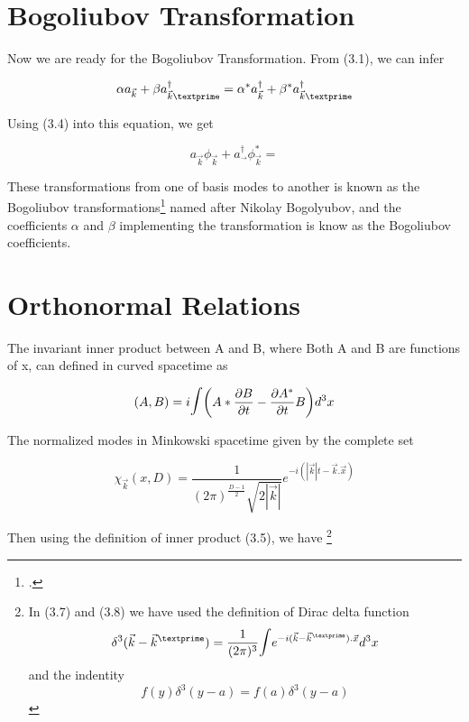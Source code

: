 \section{Bogoliubov Transformation}

Now we are ready for the Bogoliubov Transformation. From (3.1), we can infer

\begin{equation*}
\alpha a_{\vec{k}}+\beta a^\dagger_{\vec{k}\textprime} = \alpha^* a^\dagger_{\vec{k}}+\beta^* a^\dagger_{\vec{k}\textprime}  \end{equation*}

Using (3.4) into this equation, we get

\begin{equation*}
a_{\vec{k}}\phi_{\vec{k}}+ a^\dagger_{\vec{}}\phi^*_{\vec{k}}=
\end{equation*}

These transformations from one of basis modes to another is known as the Bogoliubov transformations\footcite[For a review please see ][]{Jacobson:2003} named after Nikolay Bogolyubov, and the coefficients $\alpha$ and $\beta$ implementing the transformation is know as the Bogoliubov coefficients.

\section{Orthonormal Relations}

The invariant inner product between A and B, where Both A and B are functions of x, can defined in curved spacetime as 

\begin{equation}
(A,B) = i \mathlarger{\mathlarger{\int}} \bigg(A*\frac{\partial B}{\partial t} - \frac{\partial A^*}{\partial t}B \bigg) d^3x
\end{equation}

The normalized modes in Minkowski spacetime given by the complete set

\begin{equation}
\chi_{\vec{k}} (x,D) = \frac{1}{(2\pi)^{\frac{D-1}{2}} \sqrt{2|\vec{k}|}}e^{-i(|\vec{k}|t - \vec{k}.\vec{x})}
\end{equation}

Then using the definition of inner product (3.5), we have \footnote{In (3.7) and (3.8) we have used the definition of Dirac delta function
$$\delta^3 (\vec{k} - \vec{k}^\textprime) = \frac{1}{(2\pi)^3}\mathlarger{\int} e^{-i(\vec{k} - \vec{k}^\textprime).\vec{x}}d^3x $$
and the indentity
$$f(y)\delta ^3(y-a) = f(a)\delta ^3(y-a)$$
}

